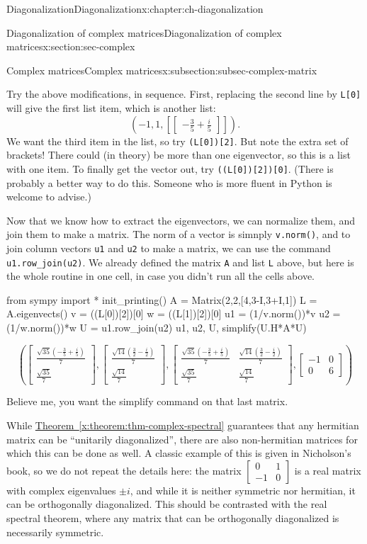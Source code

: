 \documentclass[oneside,10pt,]{book}
\newcommand{\xreffont}{\relax}
\newcommand{\mono}[1]{\texttt{#1}}
\numberwithin{equation}{section}
\newcommand{\bbm}{\begin{bmatrix}}
\newcommand{\ebm}{\end{bmatrix}}
\newcommand{\amp}{&}
\begin{document}
\begin{chapterptx}{Diagonalization}{}{Diagonalization}{}{}{x:chapter:ch-diagonalization}
\begin{sectionptx}{Diagonalization of complex matrices}{}{Diagonalization of complex matrices}{}{}{x:section:sec-complex}
\begin{subsectionptx}{Complex matrices}{}{Complex matrices}{}{}{x:subsection:subsec-complex-matrix}
\begin{sageoutput}
\end{sageoutput}
Try the above modifications, in sequence. First, replacing the second line by \mono{L[0]} will give the first list item, which is another list:%
\begin{equation*}
\left(-1,1,\left[\bbm -\frac35+\frac{i}{5}\ebm\right]\right)\text{.}
\end{equation*}
We want the third item in the list, so try \mono{(L[0])[2]}. But note the extra set of brackets! There could (in theory) be more than one eigenvector, so this is a list with one item. To finally get the vector out, try \mono{((L[0])[2])[0]}. (There is probably a better way to do this. Someone who is more fluent in Python is welcome to advise.)%
\par
Now that we know how to extract the eigenvectors, we can normalize them, and join them to make a matrix. The norm of a vector is simnply \mono{v.norm()}, and to join column vectors \mono{u1} and \mono{u2} to make a matrix, we can use the command \mono{u1.row\_join(u2)}. We already defined the matrix \mono{A} and list \mono{L} above, but here is the whole routine in one cell, in case you didn't run all the cells above.%
\begin{sageinput}
from sympy import *
init_printing()
A = Matrix(2,2,[4,3-I,3+I,1])
L = A.eigenvects()
v = ((L[0])[2])[0]
w = ((L[1])[2])[0]
u1 = (1/v.norm())*v
u2 = (1/w.norm())*w
U = u1.row_join(u2)
u1, u2, U, simplify(U.H*A*U)
\end{sageinput}
\begin{sageoutput}
\[\left(\bbm\frac{\sqrt{35}(-\frac35+\frac{i}{5})}{7}\\ \frac{\sqrt{35}}{7}\ebm,\bbm \frac{\sqrt{14}(\frac32-\frac{i}{2})}{7}\\ \frac{\sqrt{14}}{7}\ebm,
\bbm \frac{\sqrt{35}(-\frac35+\frac{i}{5})}{7} \amp \frac{\sqrt{14}(\frac32-\frac{i}{2})}{7}\\ \frac{\sqrt{35}}{7} \amp\frac{\sqrt{14}}{7}\ebm,
\bbm -1\amp 0\\0\amp 6\ebm\right)\]
\end{sageoutput}
Believe me, you want the simplify command on that last matrix.%
\par
While \hyperref[x:theorem:thm-complex-spectral]{Theorem~{\xreffont\ref{x:theorem:thm-complex-spectral}}} guarantees that any hermitian matrix can be ``unitarily diagonalized'', there are also non-hermitian matrices for which this can be done as well. A classic example of this is given in Nicholson's book, so we do not repeat the details here: the matrix \(\bbm 0\amp 1\\-1\amp 0\ebm\) is a real matrix with complex eigenvalues \(\pm i\), and while it is neither symmetric nor hermitian, it can be orthogonally diagonalized. This should be contrasted with the real spectral theorem, where any matrix that can be orthogonally diagonalized is necessarily symmetric.%

\end{subsectionptx}
\end{sectionptx}
\end{chapterptx}
\end{document}
